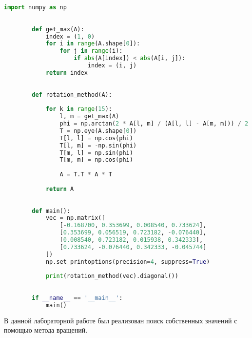 \documentclass[14pt, a4paper, fleqn]{extarticle}
\begin{document}
	\begin{lstlisting}[language=Python, caption={Компьютерная реализация алгоритма}]
		import numpy as np
		
		
		def get_max(A):
			index = (1, 0)
			for i in range(A.shape[0]):
				for j in range(i):
					if abs(A[index]) < abs(A[i, j]):
						index = (i, j)
			return index
		
		
		def rotation_method(A):
		
			for k in range(15):
				l, m = get_max(A)
				phi = np.arctan(2 * A[l, m] / (A[l, l] - A[m, m])) / 2
				T = np.eye(A.shape[0])
				T[l, l] = np.cos(phi)
				T[l, m] = -np.sin(phi)
				T[m, l] = np.sin(phi)
				T[m, m] = np.cos(phi)
		
				A = T.T * A * T
		
			return A
		
		
		def main():
			vec = np.matrix([
				[-0.168700, 0.353699, 0.008540, 0.733624],
				[0.353699, 0.056519, 0.723182, -0.076440],
				[0.008540, 0.723182, 0.015938, 0.342333],
				[0.733624, -0.076440, 0.342333, -0.045744]
			])
			np.set_printoptions(precision=4, suppress=True)
		
			print(rotation_method(vec).diagonal())
		
		
		if __name__ == '__main__':
			main()
	\end{lstlisting}
	В данной лабораторной работе был реализован поиск собственных значений с помощью метода вращений.
\end{document}
